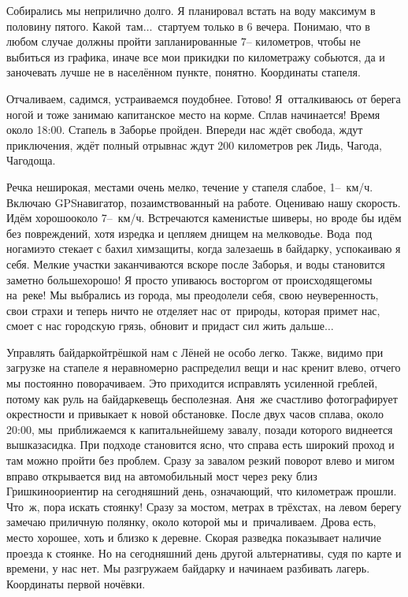 Собирались мы неприлично долго. Я планировал встать на воду максимум в половину пятого. Какой~там$\ldots$~стартуем только в 6 вечера. Понимаю, что в любом случае должны пройти запланированные 7\thinspace\nobreakdash-- километров, чтобы не выбиться из графика, иначе все мои прикидки по километражу собьются, да и заночевать лучше не в населённом пункте, понятно. Координаты стапеля\mdash \CoordsLidFifteenStapel. 

Отчаливаем, садимся, устраиваемся поудобнее. Готово! Я~отталкиваюсь от берега ногой и тоже занимаю капитанское место на корме. Сплав начинается! Время около 18:00. Стапель в Заборье пройден. Впереди нас ждёт свобода, ждут приключения, ждёт полный отрыв\mdash нас ждут 200 километров рек Лидь, Чагода, Чагодоща. 

Речка неширокая, местами очень мелко, течение у стапеля слабое, 1\thinspace\nobreakdash--~км/ч. Включаю GPS\sdash навигатор, позаимствованный на работе. Оцениваю нашу скорость. Идём хорошо\mdash около 7\thinspace\nobreakdash--~км/ч. Встречаются каменистые шиверы, но вроде бы идём без повреждений, хотя изредка и цепляем днищем на мелководье. Вода~под ногами\mdash это стекает с бахил химзащиты, когда залезаешь в байдарку, успокаиваю я себя. Мелкие участки заканчиваются вскоре после Заборья, и воды становится заметно больше\mdash хорошо! Я просто упиваюсь восторгом от происходящего\mdash мы на~реке! Мы выбрались из города, мы преодолели себя, свою неуверенность, свои страхи и теперь ничто не отделяет нас от~природы, которая примет нас, смоет с нас городскую грязь, обновит и придаст сил жить дальше$\ldots$

Управлять байдаркой\sdash трёшкой нам с Лёней не особо легко. Также, видимо при загрузке на стапеле я неравномерно распределил вещи и нас кренит влево, отчего мы постоянно поворачиваем. Это приходится исправлять усиленной греблей, потому как руль на байдарке\mdash вещь бесполезная. Аня~же счастливо фотографирует окрестности и привыкает к новой обстановке. 
\newpage
После двух часов сплава, около 20:00, мы~приближаемся к капитальнейшему завалу, позади которого виднеется вышка\sdash засидка. При подходе становится ясно, что справа есть широкий проход и там можно пройти  без проблем. Сразу за завалом резкий поворот влево и мигом вправо открывается вид на автомобильный мост через реку близ Гришкино\mdash ориентир на сегодняшний день, означающий, что километраж прошли. Что~ж, пора искать стоянку! Сразу за мостом, метрах в трёхстах, на левом берегу замечаю приличную полянку, около которой мы и~причаливаем. Дрова есть, место хорошее, хоть и близко к деревне. Скорая разведка показывает наличие проезда к стоянке. Но на сегодняшний день другой альтернативы, судя по карте и времени, у нас нет. Мы разгружаем байдарку и начинаем разбивать лагерь. Координаты первой ночёвки\mdash \CoordsLidFifteenGrishkino. 

